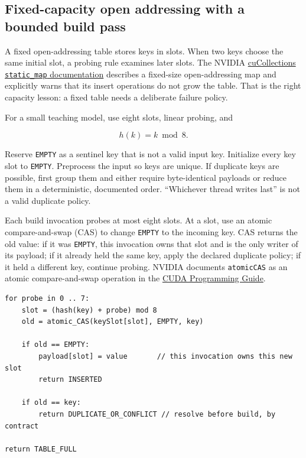 \subsection{Fixed-capacity open addressing with a bounded build pass}\label{03-visual-computing-i-ch016-fixed-capacity-open-addressing-with-a-bounded-build-pass}

A fixed open-addressing table stores keys in slots. When two keys choose the same initial slot, a probing rule examines later slots. The NVIDIA \href{https://github.com/NVIDIA/cuCollections/blob/dev/include/cuco/static_map.cuh}{cuCollections \texttt{static\_map} documentation} describes a fixed-size open-addressing map and explicitly warns that its insert operations do not grow the table. That is the right capacity lesson: a fixed table needs a deliberate failure policy.

For a small teaching model, use eight slots, linear probing, and

\[
h(k)=k\bmod8.
\]

Reserve \texttt{EMPTY} as a sentinel key that is not a valid input key. Initialize every key slot to \texttt{EMPTY}. Preprocess the input so keys are unique. If duplicate keys are possible, first group them and either require byte-identical payloads or reduce them in a deterministic, documented order. ``Whichever thread writes last'' is not a valid duplicate policy.

Each build invocation probes at most eight slots. At a slot, use an atomic compare-and-swap (CAS) to change \texttt{EMPTY} to the incoming key. CAS returns the old value: if it was \texttt{EMPTY}, this invocation owns that slot and is the only writer of its payload; if it already held the same key, apply the declared duplicate policy; if it held a different key, continue probing. NVIDIA documents \texttt{atomicCAS} as an atomic compare-and-swap operation in the \href{https://docs.nvidia.com/cuda/cuda-programming-guide/pdf/cuda-programming-guide.pdf}{CUDA Programming Guide}.

\begin{verbatim}
for probe in 0 .. 7:
    slot = (hash(key) + probe) mod 8
    old = atomic_CAS(keySlot[slot], EMPTY, key)

    if old == EMPTY:
        payload[slot] = value       // this invocation owns this new slot
        return INSERTED

    if old == key:
        return DUPLICATE_OR_CONFLICT // resolve before build, by contract

return TABLE_FULL
\end{verbatim}

